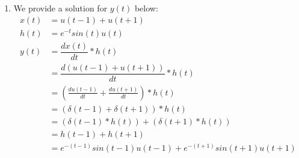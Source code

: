 \documentclass[10pt,a4paper, margin=1in]{article}
\begin{document}
\begin{enumerate}
\begin{enumerate}
   
    
    \item %
    We provide a solution for $y(t)$ below:
    \begin{equation}
    \begin{split}
        x(t) & = u(t-1) + u(t+1)\\
        h(t) & = e^{-t}sin(t)u(t)\\
        y(t) & = \dfrac{dx(t)}{dt}*h(t) \\
             & = \dfrac{d(u(t-1)+u(t+1))}{dt} * h(t)\\
             & = \left( \frac{du(t-1)}{dt} + \frac{du(t+1)}{dt} \right) * h(t)\\
             & = \left(\delta(t-1) + \delta(t+1) \right)*h(t)\\
             & = \left( \delta(t-1) * h(t) \right) +  \left( \delta(t+1) * h(t) \right)\\
             & = h(t-1) + h(t+1) \\
             & = e^{-(t-1)}sin(t-1)u(t-1) + e^{-(t+1)}sin(t+1)u(t+1)
    \end{split}
    \end{equation}
    \end{enumerate}


\end{enumerate}
\end{document}
